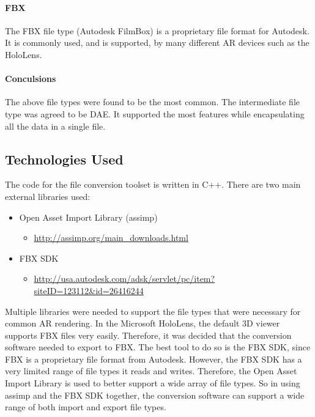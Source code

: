     \paragraph{FBX}
    The FBX file type (Autodesk FilmBox) is a proprietary file format for Autodesk.  It is commonly used, and is supported, by many different AR devices such as the HoloLens.

    \paragraph{Conculsions}
    The above file types were found to be the most common.  The intermediate file type was agreed to be DAE.  It supported the most features while encapsulating all the data in a single file.

    \subsection{Technologies Used}
    
    The code for the file conversion toolset is written in C++.  There are two main external libraries used:
    \begin{itemize}
        \item Open Asset Import Library (assimp)
        \begin{itemize}
            \item \url{http://assimp.org/main_downloads.html}
        \end{itemize}

        \item FBX SDK
        \begin{itemize}
            \item \url{http://usa.autodesk.com/adsk/servlet/pc/item?siteID=123112&id=26416244}
        \end{itemize}
    \end{itemize}

    Multiple libraries were needed to support the file types that were necessary for common AR rendering.  In the Microsoft HoloLens, the default
    3D viewer supports FBX files very easily.  Therefore, it was decided that the conversion software needed to export to FBX.  The best tool to do 
    so is the FBX SDK, since FBX is a proprietary file format from Autodesk.  However, the FBX SDK has a very limited range of file types it reads and writes.
    Therefore, the Open Asset Import Library is used to better support a wide array of file types.  So in using assimp and the FBX SDK together,
    the conversion software can support a wide range of both import and export file types.

